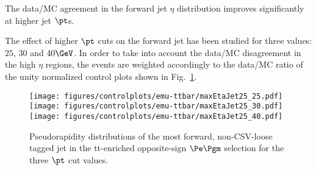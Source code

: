 The data/MC agreement in the forward jet $\eta$ distribution improves significantly at higher jet $\pt$s.

The effect of higher $\pt$ cuts on the forward jet has been studied for three values: $25$, $30$ and $40\GeV$.
In order to take into account the data/MC disagreement in the high $\eta$ regions, the events are weighted accordingly to the data/MC ratio of the unity normalized control plots shown in Fig.~\ref{fig:ptCutVar}.
\begin{figure} [!h]
  \centering
  \texttt{[image: figures/controlplots/emu-ttbar/maxEtaJet25\_25.pdf]}
  \texttt{[image: figures/controlplots/emu-ttbar/maxEtaJet25\_30.pdf]}
  \texttt{[image: figures/controlplots/emu-ttbar/maxEtaJet25\_40.pdf]}\\
\caption{Pseudorapidity distributions of the most forward, non-CSV-loose tagged jet in the tt-enriched opposite-sign $\Pe\Pgm$ selection for the three $\pt$ cut values.}
\label{fig:ptCutVar}
\end{figure}

